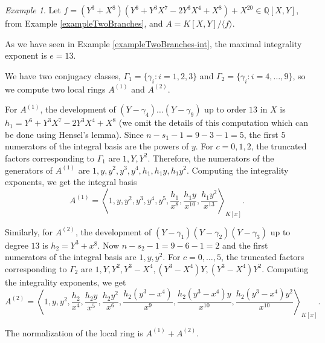 \documentclass[a4paper,11pt]{amsart}%
\theoremstyle{definition}
\theoremstyle{plain}
\theoremstyle{remark}
\newtheorem{example}[defn]{Example}
\begin{document}
\begin{example}
\label{exampleTwoBranches-locloc} 
Let $f = (Y^3+X^8)(Y^6 + Y^3X^7 - 2Y^3X^4 + X^8) + X^{20}
\in{\mathbb{Q}}[X,Y]$, from Example \ref{exampleTwoBranches}, and $A = K[X,Y]
/ \langle f \rangle$. 


As we have seen in Example \ref{exampleTwoBranches-int}, the maximal
integrality exponent is $e = 13$.

We have two conjugacy classes, $\varGamma_{1} = \{\gamma_{i}: i=1, 2, 3\}$ and 
$\varGamma_{2} = \{\gamma_{i}: i = 4, \dots, 9\}$, so we compute
two local rings $A^{(1)}$ and $A^{(2)}$.

For $A^{(1)}$, the development of $(Y - \gamma_{4}) \dots (Y-\gamma_{9})$ up to order
$13$ in $X$ is $h_1 = Y^6 + Y^3X^7 - 2Y^3X^4 + X^8$ (we omit the details
of this computation which can be done using Hensel's lemma). Since $n - s_{1}
- 1 = 9 - 3 - 1 = 5$, the first $5$ numerators of the integral basis are the powers of $y$. 
For $c = 0, 1, 2$, the truncated factors corresponding to
$\varGamma_{1}$ are $1, Y, Y^{2}$. Therefore, the numerators of the generators
of $A^{(1)}$ are $1, y, y^2, y^3, y^4, h_1, h_1 y, h_{1} y^{2}$. Computing
the integrality exponents, we get the integral basis 
{\small
\[
A^{(1)} = \left\langle 1,
y, y^2, y^3, y^4, y^5, \frac{h_1}{x^8}, \frac{h_{1} y}{x^{10}}, \frac{h_{1} y^{2}}{x^{13}}\right\rangle_{K[x]}.
\]
}

Similarly, for $A^{(2)}$, the development of $(Y - \gamma_{1})(Y - \gamma_{2})(Y
- \gamma_{3})$ up to degree $13$ is $h_2 = Y^3 + x^8$. Now $n - s_{2} - 1 = 9 - 6 - 1 = 2$ and the
first numerators of the integral basis are $1, y, y^2$. For $c = 0, \dots, 5$, the truncated factors corresponding to
$\varGamma_{2}$ are $1, Y, Y^2, Y^3 - X^4, (Y^3 - X^4)Y, (Y^3 - X^4)Y^2$. Computing the integrality exponents, we get 
{\small
\[
A^{(2)} = \left\langle 1, y, y^2, 
\frac{h_{2}}{x^{4}}, \frac{h_{2} y}{x^{5}}, \frac{h_{2} y^2}{x^{6}}, 
\frac{h_{2}(y^3-x^4)}{x^{9}}, \frac{h_{2}(y^3-x^4)y}{x^{10}}, \frac{h_{2}(y^3-x^4)y^2}{x^{10}}
\right\rangle_{K[x]}.
\]
}

The normalization of the local ring is $A^{(1)} + A^{(2)}$.
\end{example}
\end{document}
